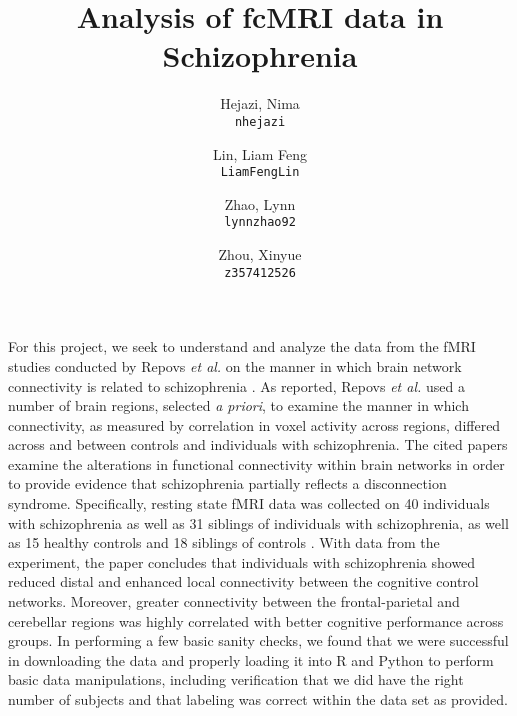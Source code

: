 \documentclass[11pt]{article}
\title{Analysis of fcMRI data in Schizophrenia}
\author{
  Hejazi, Nima\\
  \texttt{nhejazi}
  \and
  Lin, Liam Feng\\
  \texttt{LiamFengLin}
  \and
  Zhao, Lynn\\
  \texttt{lynnzhao92}
  \and
  Zhou, Xinyue\\
  \texttt{z357412526}
}
\begin{document}
\maketitle

For this project, we seek to understand and analyze the data from the fMRI 
studies conducted by Repovs \textit{et al.} on the manner in which brain 
network connectivity is related to schizophrenia \cite{repovs2011,repovs2012}.
As reported, Repovs \textit{et al.} used a number of brain regions, selected
\textit{a priori}, to examine the manner in which connectivity, as measured 
by correlation in voxel activity across regions, differed across and between 
controls and individuals with schizophrenia. The cited papers examine the 
alterations in functional connectivity within brain networks in order to 
provide evidence that schizophrenia partially reflects a disconnection 
syndrome. Specifically, resting state fMRI data was collected on 40 
individuals with schizophrenia as well as 31 siblings of individuals with 
schizophrenia, as well as 15 healthy controls and 18 siblings of controls
\cite{repovs2011}. With data from the experiment, the paper concludes that 
individuals with schizophrenia showed reduced distal and enhanced local 
connectivity between the cognitive control networks. Moreover, greater 
connectivity between the frontal-parietal and cerebellar regions was highly
correlated with better cognitive performance across groups. In performing a few
basic sanity checks, we found that we were successful in downloading the data 
and properly loading it into R and Python to perform basic data manipulations,
including verification that we did have the right number of subjects and that 
labeling was correct within the data set as provided.
\end{document}
